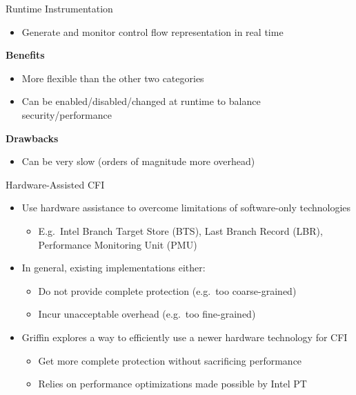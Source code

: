 \documentclass[12pt, dvipsnames, aspectratio=169]{beamer}
\newcommand{\red}[1]{{\color{red}#1}}
\newcommand{\blue}[1]{{\color{blue}#1}}
\begin{document}
\begin{frame}[c]{Runtime Instrumentation}{}
  \begin{itemize}
    \item Generate and monitor control flow representation in real time
  \end{itemize}

  \vfill
  {\bf \blue{Benefits}}
  \begin{itemize}
    \item More flexible than the other two categories
    \item Can be enabled/disabled/changed at runtime to balance security/performance
  \end{itemize}

  \vfill
  {\bf \red{Drawbacks}}
  \begin{itemize}
    \item Can be very slow (orders of magnitude more overhead)
  \end{itemize}
\end{frame}

\begin{frame}[c]{Hardware-Assisted CFI}{}
  \begin{itemize}
    \item Use hardware assistance to overcome limitations of software-only technologies
    \begin{itemize}
      \item E.g.~Intel Branch Target Store (BTS), Last Branch Record (LBR), Performance Monitoring Unit (PMU)
    \end{itemize}

    \vfill
    \item In general, existing implementations either:
    \begin{itemize}
      \item Do not provide complete protection (e.g.~too coarse-grained)
      \item Incur unacceptable overhead (e.g.~too fine-grained)
    \end{itemize}

    \vfill
    \item Griffin explores a way to efficiently use a newer hardware technology for CFI
    \begin{itemize}
      \item Get more complete protection without sacrificing performance
      \item Relies on performance optimizations made possible by Intel PT
    \end{itemize}
  \end{itemize}
\end{frame}
\end{document}
